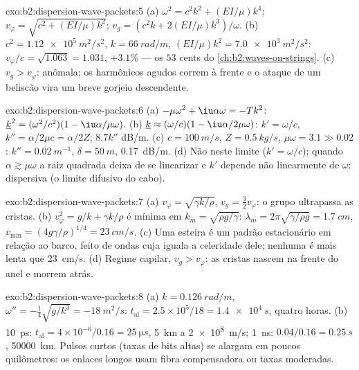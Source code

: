 \begin{solution}{exo:b2:dispersion-wave-packets:5}
(a) $\omega^2 = c^2k^2 + (EI/\mu)k^4$; $v_\varphi = \sqrt{c^2 + (EI/\mu)k^2}$; $v_g = (c^2k +
2(EI/\mu)k^3)/\omega$. (b) $c^2 = \qty{1.12e5}{m^2/s^2}$, $k = \qty{66}{rad/m}$, $(EI/\mu)k^2
= \qty{7.0e3}{m^2/s^2}$: $v_\varphi/c = \sqrt{1.063} = 1.031$, $+3.1\%$ --- os $53$ cents do
\cref{ch:b2:waves-on-strings}. (c) $v_g > v_\varphi$: anômala; os harmônicos
agudos correm à frente e o ataque de um beliscão vira um breve
gorjeio descendente.
\end{solution}

\begin{solution}{exo:b2:dispersion-wave-packets:6}
(a) $-\mu\omega^2 + \iu\alpha\omega = -Tk^2$: $\underline k^2 = (\omega^2/c^2)(1 - \iu\alpha/\mu\omega)$.
(b) $\underline k \approx (\omega/c)(1 - \iu\alpha/2\mu\omega)$: $k' = \omega/c$, $k'' = \alpha/2\mu c =
\alpha/2Z$; $8.7k''$ dB/m. (c) $c = \qty{100}{m/s}$, $Z = \qty{0.5}{kg/s}$, $\mu\omega = 3.1 \gg
0.02$: $k'' = \qty{0.02}{m^{-1}}$, $\delta = \qty{50}{m}$, \qty{0.17}{dB/m}. (d) Não neste
limite ($k' = \omega/c$); quando $\alpha \gtrsim \mu\omega$ a raiz quadrada deixa de
se linearizar e $k'$ depende não linearmente de $\omega$: dispersiva (o
limite difusivo do cabo).
\end{solution}

\begin{solution}{exo:b2:dispersion-wave-packets:7}
(a) $v_\varphi = \sqrt{\gamma k/\rho}$, $v_g = \tfrac32v_\varphi$: o grupo ultrapassa as
cristas. (b) $v_\varphi^2 = g/k + \gamma k/\rho$ é mínima em $k_m = \sqrt{\rho g/\gamma}$:
$\lambda_m = 2\pi\sqrt{\gamma/\rho g} = \qty{1.7}{cm}$, $v_{\min} = (4g\gamma/\rho)^{1/4} =
\qty{23}{cm/s}$. (c) Uma esteira é um padrão estacionário em relação ao
barco, feito de ondas cuja  iguala a celeridade dele; nenhuma é
mais lenta que \qty{23}{cm/s}. (d) Regime capilar, $v_g > v_\varphi$: as cristas
nascem na frente do anel e morrem atrás.
\end{solution}

\begin{solution}{exo:b2:dispersion-wave-packets:8}
(a) $k = \qty{0.126}{rad/m}$, $\omega'' = -\tfrac14\sqrt{g/k^3} = \qty{-18}{m^2/s}$: $t_{\text{al}}
= 2.5 \times 10^5/18 = \qty{1.4e4}{s}$, quatro horas. (b) \qty{10}{ps}: $t_{\text{al}} =
4 \times 10^{-6}/0.16 = \qty{25}{\micro s}$, \qty{5}{km} a \qty{2e8}{m/s}; \qty{1}{ns}: $0.04/0.16 =
\qty{0.25}{s}$, \qty{50000}{km}. Pulsos curtos (taxas de bits altas) se alargam em
poucos quilômetros: os enlaces longos usam fibra compensadora ou taxas moderadas.
\end{solution}

